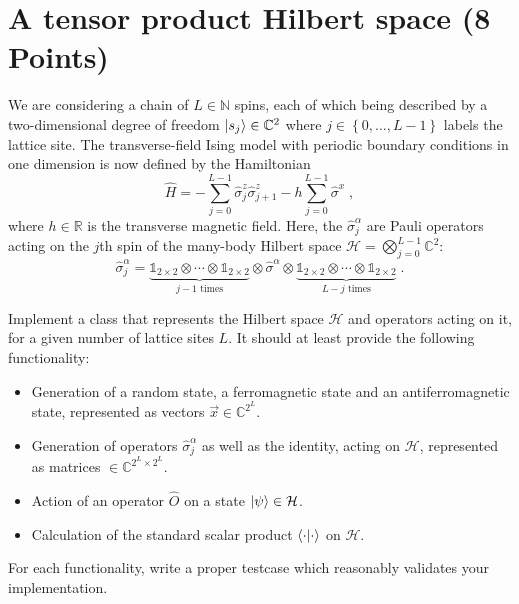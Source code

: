 \documentclass[a4paper, 12pt]{article}
\begin{document}
%
\section{A tensor product Hilbert space \textbf{(8 Points)}}
%
We are considering a chain of $L\in\mathbb N$ spins, each of which being described by a two-dimensional degree of freedom $\ket{s_j} \in \mathbb C^2$ where $j\in\left\{0,\ldots,L-1 \right\}$ labels the lattice site.
%
The transverse-field Ising model with periodic boundary conditions in one dimension is now defined by the Hamiltonian
\begin{equation}
	\hat H = -\sum_{j=0}^{L-1} \hat \sigma^z_j \hat \sigma^z_{j+1} - h \sum_{j=0}^{L-1} \hat \sigma^x \;, \label{eq:tfim}
\end{equation}
where $h\in\mathbb R$ is the transverse magnetic field.
%
Here, the $\hat \sigma^\alpha_j$ are Pauli operators acting on the $j$th spin of the many-body Hilbert space $\mathcal H = \bigotimes_{j=0}^{L-1} \mathbb C^2$:
\begin{equation}
	 \hat \sigma^\alpha_j = \underbrace{\mathbb 1_{2\times 2} \otimes \cdots \otimes \mathbb 1_{2\times 2}}_{j-1\text{ times}} \otimes \hat \sigma^\alpha \otimes \underbrace{\mathbb 1_{2\times 2} \otimes \cdots \otimes \mathbb 1_{2\times 2}}_{L-j\text{ times}} \;.
\end{equation}
%

%
Implement a class that represents the Hilbert space $\mathcal H$ and operators acting on it, for a given number of lattice sites $L$.
%
It should at least provide the following functionality:
\begin{itemize}
	\item Generation of a random state, a ferromagnetic state and an antiferromagnetic state, represented as vectors $\vec x \in \mathbb C^{2^L}$.
	\item Generation of operators $\hat \sigma^\alpha_j$ as well as the identity, acting on $\mathcal{H}$, represented as matrices $\in \mathbb C^{2^L \times 2^L}$.
	\item Action of an operator $\hat O$ on a state $\ket{\psi} \in \mathcal H$.
	\item Calculation of the standard scalar product $\braket{\cdot | \cdot}$ on $\mathcal H$.
\end{itemize}
%
For each functionality, write a proper testcase which reasonably validates your implementation.
%

%
\end{document}
